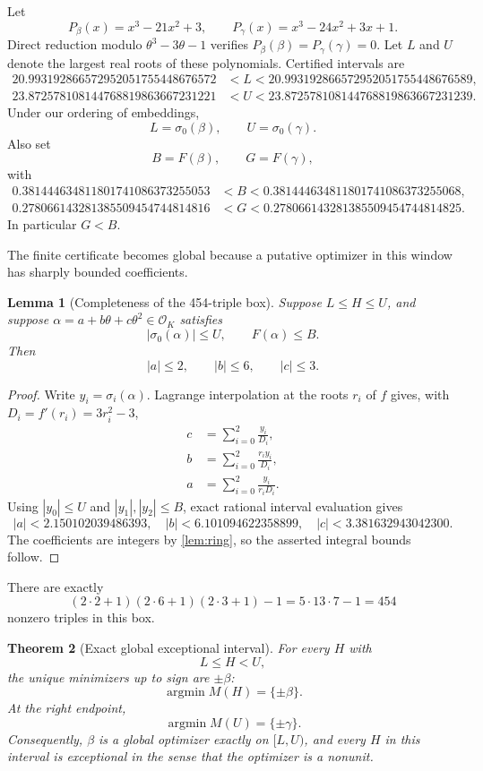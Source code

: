 \documentclass[11pt]{article}
\newtheorem{theorem}{Theorem}[section]
\newtheorem{lemma}[theorem]{Lemma}
\theoremstyle{definition}
\newcommand{\OK}{\mathcal O_K}
\begin{document}
Let
\[
P_\beta(x)=x^3-21x^2+3,
\qquad
P_\gamma(x)=x^3-24x^2+3x+1.
\]
Direct reduction modulo $\theta^3-3\theta-1$ verifies
$P_\beta(\beta)=P_\gamma(\gamma)=0$.  Let $L$ and $U$ denote the largest real roots of these polynomials.  Certified intervals are
\begin{align*}
20.993192866572952051755448676572
&<L<
20.993192866572952051755448676589,\\
23.872578108144768819863667231221
&<U<
23.872578108144768819863667231239.
\end{align*}
Under our ordering of embeddings,
\[
L=\sigma_0(\beta),\qquad U=\sigma_0(\gamma).
\]
Also set
\[
B=F(\beta),\qquad G=F(\gamma),
\]
with
\begin{align*}
0.381444634811801741086373255053
&<B<0.381444634811801741086373255068,\\
0.278066143281385509454744814816
&<G<0.278066143281385509454744814825.
\end{align*}
In particular $G<B$.

The finite certificate becomes global because a putative optimizer in this window has sharply bounded coefficients.

\begin{lemma}[Completeness of the 454-triple box]\label{lem:box}
Suppose $L\le H\le U$, and suppose $\alpha=a+b\theta+c\theta^2\in\OK$ satisfies
\[
|\sigma_0(\alpha)|\le U,
\qquad
F(\alpha)\le B.
\]
Then
\[
|a|\le2,\qquad |b|\le6,\qquad |c|\le3.
\]
\end{lemma}
\begin{proof}
Write $y_i=\sigma_i(\alpha)$.  Lagrange interpolation at the roots $r_i$ of $f$ gives, with $D_i=f'(r_i)=3r_i^2-3$,
\[
\begin{aligned}
c&=\sum_{i=0}^2\frac{y_i}{D_i},\\
b&=\sum_{i=0}^2\frac{r_i y_i}{D_i},\\
a&=\sum_{i=0}^2\frac{y_i}{r_iD_i}.
\end{aligned}
\]
Using $|y_0|\le U$ and $|y_1|,|y_2|\le B$, exact rational interval evaluation gives
\[
|a|<2.150102039486393,
\quad
|b|<6.101094622358899,
\quad
|c|<3.381632943042300.
\]
The coefficients are integers by \cref{lem:ring}, so the asserted integral bounds follow.
\end{proof}

There are exactly
\[
(2\cdot2+1)(2\cdot6+1)(2\cdot3+1)-1
=5\cdot13\cdot7-1=454
\]
nonzero triples in this box.

\begin{theorem}[Exact global exceptional interval]\label{thm:beta}
For every $H$ with
\[
L\le H<U,
\]
the unique minimizers up to sign are $\pm\beta$:
\[
\operatorname*{argmin} M(H)=\{\pm\beta\}.
\]
At the right endpoint,
\[
\operatorname*{argmin} M(U)=\{\pm\gamma\}.
\]
Consequently, $\beta$ is a global optimizer exactly on $[L,U)$, and every $H$ in this interval is exceptional in the sense that the optimizer is a nonunit.
\end{theorem}
\end{document}
